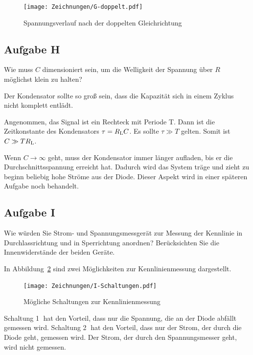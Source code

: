 \begin{figure}[h]
	\centering
	\caption{%
		Spannungsverlauf nach der doppelten Gleichrichtung
	}
	\label{fig:G-doppelt}
	\texttt{[image: Zeichnungen/G-doppelt.pdf]}
\end{figure}

\subsection{Aufgabe H}

\begin{problem}
	Wie muss $C$ dimensioniert sein, um die Welligkeit der Spannung über $R$
	möglichst klein zu halten?
\end{problem}

Der Kondensator sollte so groß sein, dass die Kapazität sich in einem Zyklus
nicht komplett entlädt.

Angenommen, das Signal ist ein Rechteck mit Periode T. Dann ist die
Zeitkonstante des Kondensators $\tau = R_\text L C$. Es sollte $\tau \gg T$
gelten. Somit ist $C \gg T R_\text L$.

Wenn $C \to \infty$ geht, muss der Kondensator immer länger aufladen, bis er
die Durchschnittsspannung erreicht hat. Dadurch wird das System träge und zieht
zu beginn beliebig hohe Ströme aus der Diode. Dieser Aspekt wird in einer
späteren Aufgabe noch behandelt.

\subsection{Aufgabe I}

\begin{problem}
	Wie würden Sie Strom- und Spannungsmessgerät zur Messung der Kennlinie in
	Durchlassrichtung und in Sperrichtung anordnen? Berücksichten Sie die
	Innenwiderstände der beiden Geräte.
\end{problem}

In Abbildung~\ref{fig:I-Schaltungen} sind zwei Möglichkeiten zur
Kennlinienmessung dargestellt.

\begin{figure}[h]
	\centering
	\caption{%
		Mögliche Schaltungen zur Kennlinienmessung
	}
	\label{fig:I-Schaltungen}
	\texttt{[image: Zeichnungen/I-Schaltungen.pdf]}
\end{figure}

Schaltung \textcircled 1 hat den Vorteil, dass nur die Spannung, die an der
Diode abfällt gemessen wird. Schaltung \textcircled 2 hat den Vorteil, dass nur
der Strom, der durch die Diode geht, gemessen wird. Der Strom, der durch den
Spannungsmesser geht, wird nicht gemessen.

